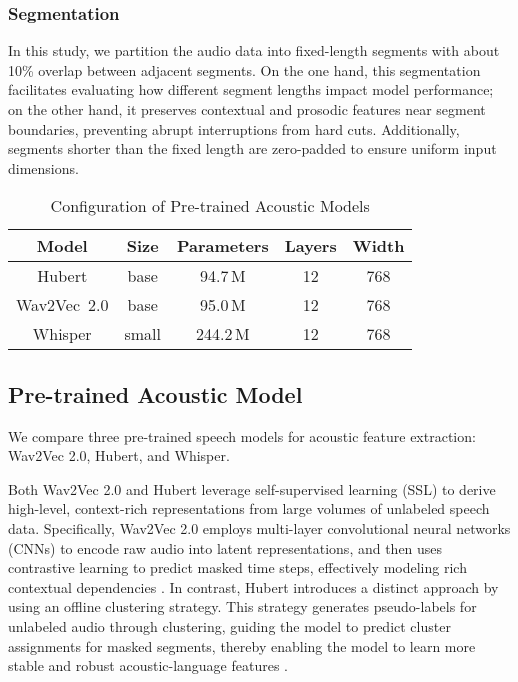 \documentclass[journal]{IEEEtran}
\begin{document}
\subsubsection{Segmentation}
In this study, we partition the audio data into fixed-length segments with about 10\% overlap between adjacent segments. 
On the one hand, this segmentation facilitates evaluating how different segment lengths impact model performance; on the other hand, it preserves contextual and prosodic features near segment boundaries, preventing abrupt interruptions from hard cuts. 
Additionally, segments shorter than the fixed length are zero-padded to ensure uniform input dimensions.



\begin{table}[!t]
\centering
\caption{Configuration of Pre-trained Acoustic Models}
\label{table:speech-models}
\small
\setlength{\tabcolsep}{5pt} 
\begin{tabular}{c c c c c} 
\toprule
\textbf{Model} & \textbf{Size} & \textbf{Parameters} & \textbf{Layers} & \textbf{Width} \\
\midrule
Hubert      & base  & 94.7\,M   & 12  & 768 \\
Wav2Vec~2.0 & base  & 95.0\,M   & 12  & 768 \\
Whisper     & small & 244.2\,M  & 12  & 768 \\
\bottomrule
\end{tabular}
\end{table}



\subsection{Pre-trained Acoustic Model}
We compare three pre-trained speech models for acoustic feature extraction: Wav2Vec 2.0, Hubert, and Whisper. 


Both Wav2Vec 2.0 and Hubert leverage self-supervised learning (SSL) to derive high-level, context-rich representations from large volumes of unlabeled speech data. Specifically, Wav2Vec 2.0 employs multi-layer convolutional neural networks (CNNs) to encode raw audio into latent representations, and then uses contrastive learning to predict masked time steps, effectively modeling rich contextual dependencies . In contrast, Hubert introduces a distinct approach by using an offline clustering strategy. This strategy generates pseudo-labels for unlabeled audio through clustering, guiding the model to predict cluster assignments for masked segments, thereby enabling the model to learn more stable and robust acoustic-language features .
\end{document}
